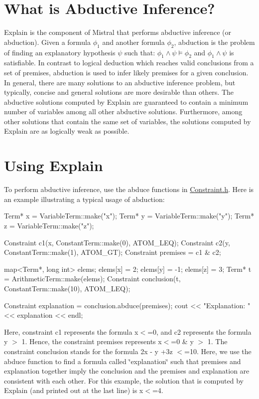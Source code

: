  \hypertarget{explain_abduction}{}\section{\-What is Abductive Inference?}\label{explain_abduction}
\-Explain is the component of \-Mistral that performs abductive inference (or abduction). \-Given a formula $ \phi_1 $ and another formula $ \phi_2 $, abduction is the problem of finding an explanatory hypothesis $ \psi $ such that\-: $ \phi_1 \land \psi \models \phi_2 $ and $ \phi_1 \land \psi $ is satisfiable. \-In contrast to logical deduction which reaches valid conclusions from a set of premises, abduction is used to infer likely premises for a given conclusion. \-In general, there are many solutions to an abductive inference problem, but typically, concise and general solutions are more desirable than others. \-The abductive solutions computed by \-Explain are guaranteed to contain a minimum number of variables among all other abductive solutions. \-Furthermore, among other solutions that contain the same set of variables, the solutions computed by \-Explain are as logically weak as possible.\hypertarget{explain_use}{}\section{\-Using Explain}\label{explain_use}
\-To perform abductive inference, use the abduce functions in \hyperlink{Constraint_8h_source}{\-Constraint.\-h}. \-Here is an example illustrating a typical usage of abduction\-:

\begin{DoxyVerb}
  Term* x = VariableTerm::make("x");
  Term* y = VariableTerm::make("y");
  Term* z = VariableTerm::make("z");

  Constraint c1(x, ConstantTerm::make(0), ATOM_LEQ);
  Constraint c2(y, ConstantTerm::make(1), ATOM_GT);
  Constraint premises = c1 & c2;

  map<Term*, long int> elems;
  elems[x] = 2;
  elems[y] = -1;
  elems[z] = 3;
  Term* t = ArithmeticTerm::make(elems);
  Constraint conclusion(t, ConstantTerm::make(10), ATOM_LEQ);

  Constraint explanation = conclusion.abduce(premises);
  cout << "Explanation: " << explanation << endl;
   \end{DoxyVerb}


\-Here, constraint c1 represents the formula x$<$=0, and c2 represents the formula y $>$ 1. \-Hence, the constraint premises represents x$<$=0 \& y $>$ 1. \-The constraint conclusion stands for the formula 2x -\/ y +3z $<$=10. \-Here, we use the abduce function to find a formula called \char`\"{}explanation\char`\"{} such that premises and explanation together imply the conclusion and the premises and explanation are consistent with each other. \-For this example, the solution that is computed by \-Explain (and printed out at the last line) is x$<$=4.


